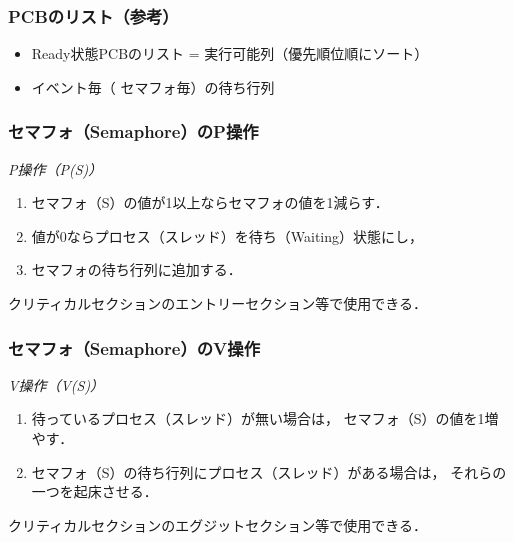 \documentclass[unicode,handout]{beamer}                   %
\begin{document}
\begin{frame}
  \frametitle{PCBのリスト（参考）}
  \begin{itemize}
    \item Ready状態PCBのリスト = 実行可能列（優先順位順にソート）
    \item イベント毎（{\color{red} セマフォ毎}）の待ち行列
  \end{itemize}
  \vfill
\end{frame}

\begin{frame}
  \frametitle{セマフォ（Semaphore）のP操作}
  \emph{P操作（P(S)）}
  \begin{enumerate}
  \item[1.] セマフォ（S）の値が1以上ならセマフォの値を1減らす．
  \item[2.] 値が0ならプロセス（スレッド）を待ち（Waiting）状態にし，
  \item[3.] セマフォの待ち行列に追加する．
  \end{enumerate}
  クリティカルセクションのエントリーセクション等で使用できる．
  \begin{center}
    \begin{minipage}{0.6\columnwidth}
    \end{minipage}
  \end{center}
  \vfill
\end{frame}

\begin{frame}
  \frametitle{セマフォ（Semaphore）のV操作}
  \emph{V操作（V(S)）}
  \begin{enumerate}
  \item[1.] 待っているプロセス（スレッド）が無い場合は，
    セマフォ（S）の値を1増やす．
  \item[2.] セマフォ（S）の待ち行列にプロセス（スレッド）がある場合は，
    それらの一つを起床させる．
  \end{enumerate}
  クリティカルセクションのエグジットセクション等で使用できる．
  \begin{center}
    \begin{minipage}{0.6\columnwidth}
    \end{minipage}
  \end{center}
  \vfill
\end{frame}
\end{document}
